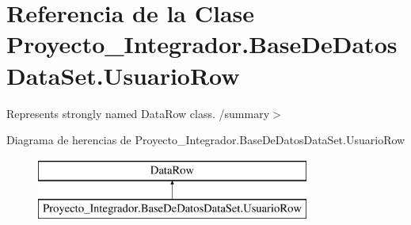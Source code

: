 \section{Referencia de la Clase Proyecto\-\_\-\-Integrador.\-Base\-De\-Datos\-Data\-Set.\-Usuario\-Row}
\label{class_proyecto___integrador_1_1_base_de_datos_data_set_1_1_usuario_row}


Represents strongly named Data\-Row class. /summary$>$  


Diagrama de herencias de Proyecto\-\_\-\-Integrador.\-Base\-De\-Datos\-Data\-Set.\-Usuario\-Row\begin{figure}[H]
\begin{center}
\leavevmode
\includegraphics[height=2.000000cm]{class_proyecto___integrador_1_1_base_de_datos_data_set_1_1_usuario_row}
\end{center}
\end{figure}
